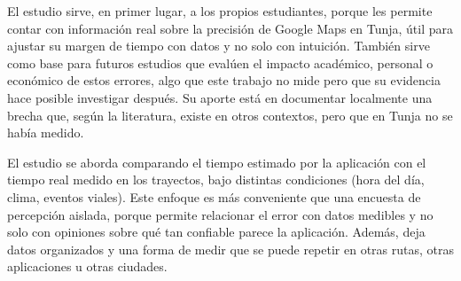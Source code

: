 El estudio sirve, en primer lugar, a los propios estudiantes, porque les permite contar con información real sobre la precisión de Google Maps en Tunja, útil para ajustar su margen de tiempo con datos y no solo con intuición. También sirve como base para futuros estudios que evalúen el impacto académico, personal o económico de estos errores, algo que este trabajo no mide pero que su evidencia hace posible investigar después. Su aporte está en documentar localmente una brecha que, según la literatura, existe en otros contextos, pero que en Tunja no se había medido.

El estudio se aborda comparando el tiempo estimado por la aplicación con el tiempo real medido en los trayectos, bajo distintas condiciones (hora del día, clima, eventos viales). Este enfoque es más conveniente que una encuesta de percepción aislada, porque permite relacionar el error con datos medibles y no solo con opiniones sobre qué tan confiable parece la aplicación. Además, deja datos organizados y una forma de medir que se puede repetir en otras rutas, otras aplicaciones u otras ciudades.

